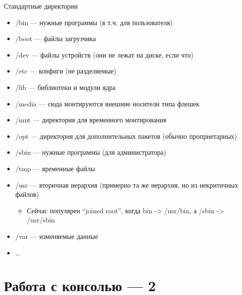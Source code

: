 \documentclass{../../slides-style}
\begin{document}
    \begin{frame}{Стандартные директории}
        \begin{itemize}
            \item /bin --- нужные программы (в т.ч. для пользователя)
            \item /boot --- файлы загрузчика
            \item /dev --- файлы устройств (они не лежат на диске, если что)
            \item /etc --- конфиги (не разделяемые)
            \item /lib --- библиотеки и модули ядра
            \item /media --- сюда монтируются внешние носители типа флешек
            \item /mnt --- директория для временного монтирования
            \item /opt --- директория для дополнительных пакетов (обычно проприетарных)
            \item /sbin --- нужные программы (для администратора)
            \item /tmp --- временные файлы
            \item /usr --- вторичная иерархия (примерно та же иерархия, но из некритичных файлов)
            \begin{itemize}
                \item Сейчас популярен \enquote{joined root}, когда bin -> /usr/bin, а /sbin -> /usr/sbin
            \end{itemize}
            \item /var --- изменяемые данные
            \item \dots
        \end{itemize}
    \end{frame}

    \section{Работа с консолью --- 2}
\end{document}
